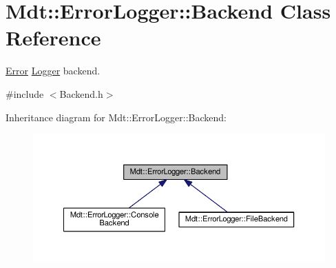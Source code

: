 \hypertarget{class_mdt_1_1_error_logger_1_1_backend}{}\section{Mdt\+:\+:Error\+Logger\+:\+:Backend Class Reference}
\label{class_mdt_1_1_error_logger_1_1_backend}


\hyperlink{class_mdt_1_1_error}{Error} \hyperlink{class_mdt_1_1_error_logger_1_1_logger}{Logger} backend.  




{\ttfamily \#include $<$Backend.\+h$>$}



Inheritance diagram for Mdt\+:\+:Error\+Logger\+:\+:Backend\+:\nopagebreak
\begin{figure}[H]
\begin{center}
\leavevmode
\includegraphics[width=350pt]{class_mdt_1_1_error_logger_1_1_backend__inherit__graph}
\end{center}
\end{figure}
